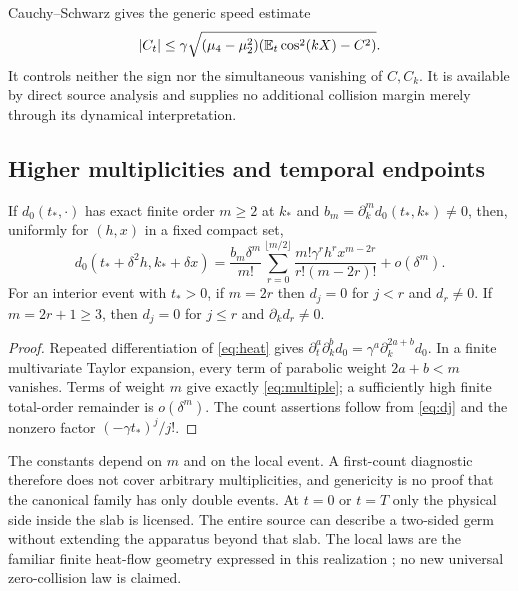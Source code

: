 Cauchy--Schwarz gives the generic speed estimate
\begin{equation}\label{eq:covbound}
 |C_t|\le\gamma\sqrt{(\mu_4-\mu_2^2)
                   (\mathbb E_t\cos^2(kX)-C^2)}.
\end{equation}
It controls neither the sign nor the simultaneous vanishing of $C,C_k$.
It is available by direct source analysis and supplies no additional
collision margin merely through its dynamical interpretation.

\subsection{Higher multiplicities and temporal endpoints}
\begin{proposition}\label{prop:multiple}
If $d_0(t_*,\cdot)$ has exact finite order $m\ge2$ at $k_*$ and
$b_m=\partial_k^m d_0(t_*,k_*)\ne0$, then, uniformly for $(h,x)$ in a
fixed compact set,
\begin{equation}\label{eq:multiple}
 d_0(t_*+\delta^2h,k_*+\delta x)
 =\frac{b_m\delta^m}{m!}
 \sum_{r=0}^{\lfloor m/2\rfloor}
 \frac{m!\gamma^rh^rx^{m-2r}}{r!(m-2r)!}+o(\delta^m).
\end{equation}
For an interior event with $t_*>0$, if $m=2r$ then $d_j=0$ for $j<r$
and $d_r\ne0$. If $m=2r+1\ge3$, then $d_j=0$ for $j\le r$ and
$\partial_kd_r\ne0$.
\end{proposition}
\begin{proof}
Repeated differentiation of \eqref{eq:heat} gives
$\partial_t^a\partial_k^b d_0=\gamma^a\partial_k^{2a+b}d_0$.
In a finite multivariate Taylor expansion, every term of parabolic
weight $2a+b<m$ vanishes. Terms of weight $m$ give exactly
\eqref{eq:multiple}; a sufficiently high finite total-order remainder is
$o(\delta^m)$. The count assertions follow from \eqref{eq:dj} and the
nonzero factor $(-\gamma t_*)^j/j!$.
\end{proof}

The constants depend on $m$ and on the local event. A first-count diagnostic
therefore does not cover arbitrary multiplicities, and genericity is no
proof that the canonical family has only double events. At $t=0$ or $t=T$
only the physical side inside the slab is licensed. The entire source can
describe a two-sided germ without extending the apparatus beyond that slab.
The local laws are the familiar finite heat-flow geometry expressed in this
realization \cite{LocalCollisionGeometry,TNDDirectCollision}; no new
universal zero-collision law is claimed.
